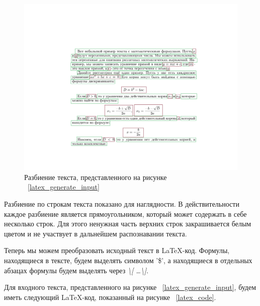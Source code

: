 \begin{figure}
    \includegraphics[scale=0.75]{img/latex_generation/segmented.jpg}
    \caption{Разбиение текста, представленного на рисунке ~\ref{latex_generate_input}}
    \label{latex_segmentation}
\end{figure}

Разбиение по строкам текста показано для наглядности. В действительности каждое разбиение является прямоугольником, который может содержать в себе несколько строк. Для этого ненужная часть верхних строк закрашивается белым цветом и не участвует в дальнейшем распознавании текста.

Теперь мы можем преобразовать исходный текст в \LaTeX-код. Формулы, находящиеся в тексте, будем выделять символом '\$', а находящиеся в отдельных абзацах формулы будем выделять через \textit{\textbackslash [ \ldots \textbackslash]}.

Для входного текста, представленного на рисунке ~\ref{latex_generate_input}, будем иметь следующий \LaTeX-код, показанный на рисунке ~\ref{latex_code}.

